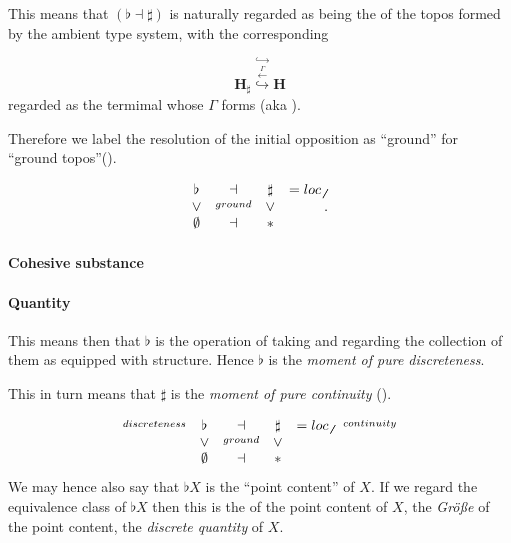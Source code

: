 \documentclass[12pt,titlepage]{article}
\newcommand{\itexarray}[1]{\begin{matrix}#1\end{matrix}}
\theoremstyle{plain}
\theoremstyle{definition}
\theoremstyle{remark}
\begin{document}
This means that $(\flat \dashv \sharp)$ is naturally regarded as being the  of the topos formed by the ambient type system, with the corresponding 

\begin{displaymath}
\mathbf{H}_{\sharp}
  \stackrel{\hookrightarrow}{\stackrel{\stackrel{\Gamma}{\longleftarrow}}{\hookrightarrow}}
  \mathbf{H}
\end{displaymath}
regarded as the termimal  whose  $\Gamma$ forms  (aka ).

Therefore we label the resolution of the initial opposition as ``ground'' for ``ground topos''().

\begin{displaymath}
\itexarray{
     \flat &\dashv& \sharp & = loc_{\not\not}
     \\
     \vee &\stackrel{ground}{}& \vee
     \\
     \emptyset &\dashv& \ast
  }
  \,.
\end{displaymath}
\hypertarget{cohesive_substance}{}\paragraph*{{Cohesive substance}}\label{cohesive_substance}

\hypertarget{IntensiveExtensive}{}\paragraph*{{Quantity}}\label{IntensiveExtensive}

This means then that $\flat$ is the operation of taking  and regarding the collection of them as equipped with  structure. Hence $\flat$ is the \emph{moment of pure discreteness}.

This in turn means that $\sharp$ is the \emph{moment of pure continuity} ().

\begin{displaymath}
\itexarray{
     \stackrel{discreteness}{} & \flat &\dashv& \sharp &= loc_{\not\not}& \stackrel{continuity}{}
     \\
     & \vee &\stackrel{ground}{}& \vee
     \\
     & \emptyset &\dashv& \ast &
  }
\end{displaymath}
We may hence also say that $\flat X$ is the ``point content'' of $X$. If we regard the equivalence class of $\flat X$ then this is the  of the point content of $X$, the \emph{Größe} of the point content, the \emph{discrete quantity} of $X$.
\end{document}
